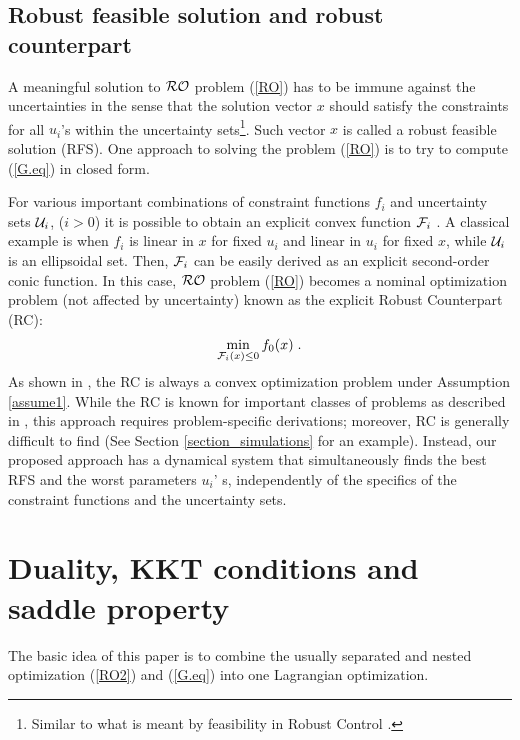 \documentclass[journal,twoside,web]{ieeecolor}
\begin{document}
\subsection{Robust feasible solution and robust counterpart}
A meaningful solution to ${\cal RO}$ problem (\ref{RO}) has to be immune against the uncertainties in the sense that the solution vector $x$ should satisfy the constraints for all $u_i$'s within the uncertainty sets\footnote{Similar to what is meant by feasibility in Robust Control \cite{zhou1995}.}. Such vector $x$ is called a robust feasible solution (RFS). One approach to solving the problem (\ref{RO}) is to try to compute (\ref{G.eq}) in closed form.

For various important combinations of constraint functions $f_i$ and uncertainty sets ${\cal U}_i$, ($i>0$) it is possible to obtain an explicit convex function ${\cal F}_i$ \cite{bental2009}. A classical example is when $f_i$ is linear in $x$ for fixed $u_i$ and linear in $u_i$ for fixed $x$, while ${\cal U}_i$ is an ellipsoidal set.
Then, ${\cal F}_i$ can be easily derived as an explicit second-order conic function.
In this case, ${\cal RO}$ problem (\ref{RO}) becomes a nominal optimization problem (not affected by uncertainty) known as the explicit {\color{blue}Robust Counterpart (RC)}:
\begin{align} \label{rc}
\displaystyle \min_{{\cal F}_i(x)\leq 0} f_0(x)\;.
\end{align}
As shown in \cite{bental2009-2}, the RC is always a convex optimization problem under Assumption \ref{assume1}. While the RC is known for important classes of problems as described in \cite{bertsimas2011}, this approach requires problem-specific derivations; moreover, RC is generally difficult to find (See Section \ref{section_simulations} for an example). Instead, our proposed approach has a dynamical system that simultaneously finds the best RFS and the worst parameters $u_i$' s, independently of the specifics of the constraint functions and the uncertainty sets.


\section{Duality, KKT conditions and saddle property} \label{section_saddle}
The basic idea of this paper is to combine the usually separated and nested optimization (\ref{RO2}) and (\ref{G.eq}) into one Lagrangian optimization.
\end{document}
